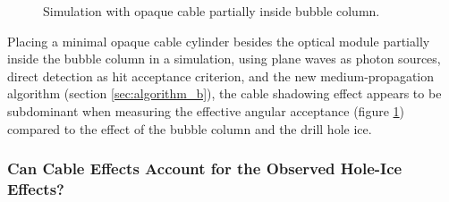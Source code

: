 
\begin{figure}[htbp]
  \hfill
  \hfill
  \caption{Simulation with opaque cable partially inside bubble column.}
  \label{fig:caweNg6o}
\end{figure}

Placing a minimal opaque cable cylinder besides the optical module partially inside the bubble column in a simulation, using plane waves as photon sources, direct detection as hit acceptance criterion, and the new medium-propagation algorithm (section \ref{sec:algorithm_b}), the cable shadowing effect appears to be subdominant when measuring the effective angular acceptance (figure \ref{fig:caweNg6o}) compared to the effect of the bubble column and the drill hole ice.



\subsubsection{Can Cable Effects Account for the Observed Hole-Ice Effects?}


